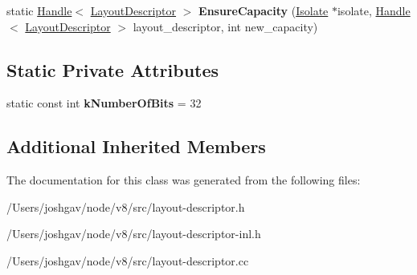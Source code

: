 \begin{DoxyCompactItemize}
\item 
static \hyperlink{classv8_1_1internal_1_1_handle}{Handle}$<$ \hyperlink{classv8_1_1internal_1_1_layout_descriptor}{Layout\+Descriptor} $>$ {\bfseries Ensure\+Capacity} (\hyperlink{classv8_1_1internal_1_1_isolate}{Isolate} $\ast$isolate, \hyperlink{classv8_1_1internal_1_1_handle}{Handle}$<$ \hyperlink{classv8_1_1internal_1_1_layout_descriptor}{Layout\+Descriptor} $>$ layout\+\_\+descriptor, int new\+\_\+capacity)\hypertarget{classv8_1_1internal_1_1_layout_descriptor_a5f90541bf28cc19f5173c3173be67e7b}{}\label{classv8_1_1internal_1_1_layout_descriptor_a5f90541bf28cc19f5173c3173be67e7b}

\end{DoxyCompactItemize}
\subsection*{Static Private Attributes}
\begin{DoxyCompactItemize}
\item 
static const int {\bfseries k\+Number\+Of\+Bits} = 32\hypertarget{classv8_1_1internal_1_1_layout_descriptor_a09d3f1ee0fcf0275d105b65882c677b7}{}\label{classv8_1_1internal_1_1_layout_descriptor_a09d3f1ee0fcf0275d105b65882c677b7}

\end{DoxyCompactItemize}
\subsection*{Additional Inherited Members}


The documentation for this class was generated from the following files\+:\begin{DoxyCompactItemize}
\item 
/\+Users/joshgav/node/v8/src/layout-\/descriptor.\+h\item 
/\+Users/joshgav/node/v8/src/layout-\/descriptor-\/inl.\+h\item 
/\+Users/joshgav/node/v8/src/layout-\/descriptor.\+cc\end{DoxyCompactItemize}
